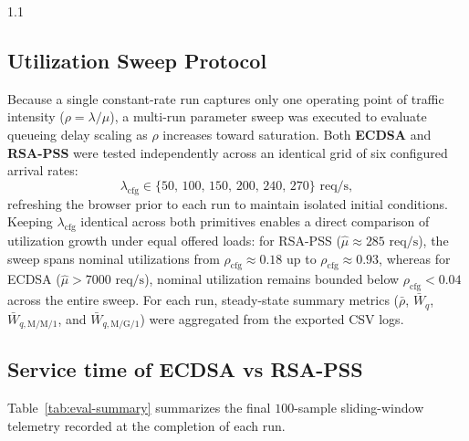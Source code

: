 \documentclass[11pt,a4paper]{article}
\begin{document}
\begin{spacing}{1.1}
\subsection{Utilization Sweep Protocol}
Because a single constant-rate run captures only one operating point of traffic intensity ($\rho = \lambda / \mu$), a multi-run parameter sweep was executed to evaluate queueing delay scaling as $\rho$ increases toward saturation. Both \textbf{ECDSA} and \textbf{RSA-PSS} were tested independently across an identical grid of six configured arrival rates:
\[
\lambda_{\text{cfg}} \in \{50,\, 100,\, 150,\, 200,\, 240,\, 270\}\text{ req/s},
\]
refreshing the browser prior to each run to maintain isolated initial conditions. Keeping $\lambda_{\text{cfg}}$ identical across both primitives enables a direct comparison of utilization growth under equal offered loads: for RSA-PSS ($\hat{\mu} \approx 285\text{ req/s}$), the sweep spans nominal utilizations from $\rho_{\text{cfg}} \approx 0.18$ up to $\rho_{\text{cfg}} \approx 0.93$, whereas for ECDSA ($\hat{\mu} > 7000\text{ req/s}$), nominal utilization remains bounded below $\rho_{\text{cfg}} < 0.04$ across the entire sweep. For each run, steady-state summary metrics ($\bar{\rho}$, $\bar{W}_q$, $\bar{W}_{q,\text{M/M/1}}$, and $\bar{W}_{q,\text{M/G/1}}$) were aggregated from the exported CSV logs.






\pagebreak
\subsection{Service time of ECDSA vs RSA-PSS}
Table~\ref{tab:eval-summary} summarizes the final $100$-sample sliding-window telemetry recorded at the completion of each run.


\end{spacing}
\end{document}
